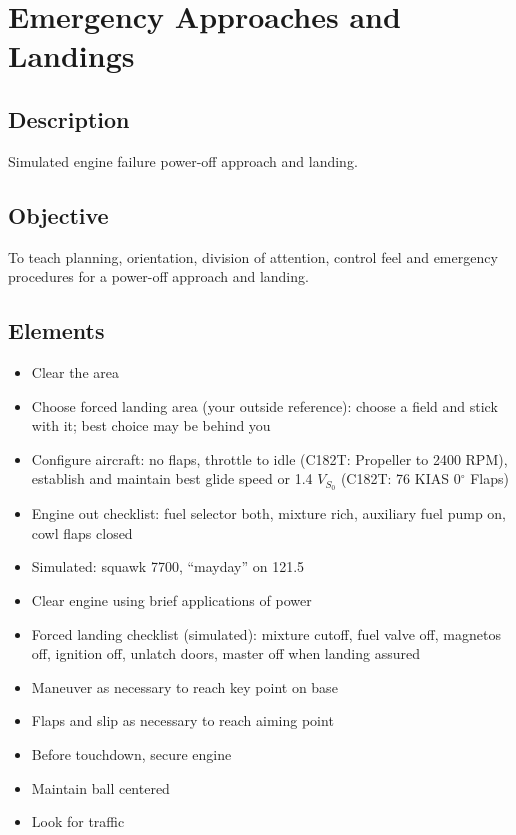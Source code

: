 \section{Emergency Approaches and Landings}

\subsection{Description}

Simulated engine failure power-off approach and landing.

\subsection{Objective}

To teach planning, orientation, division of attention, control feel and
emergency procedures for a power-off approach and landing.

\subsection{Elements}

\begin{itemize}
  \item Clear the area
  \item Choose forced landing area (your outside reference): choose a field and
    stick with it; best choice may be behind you
  \item Configure aircraft: no flaps, throttle to idle (C182T: Propeller to
    2400 RPM), establish and maintain best glide speed or 1.4 $V_{S_0}$ (C182T:
    76 KIAS 0$^\circ$ Flaps)
  \item Engine out checklist: fuel selector both, mixture
    rich, auxiliary fuel pump on, cowl flaps closed
  \item Simulated: squawk 7700, ``mayday'' on 121.5
  \item Clear engine using brief applications of power
  \item Forced landing checklist (simulated): mixture cutoff, fuel valve off,
    magnetos off, ignition off, unlatch doors, master off when landing assured
  \item Maneuver as necessary to reach key point on base
  \item Flaps and slip as necessary to reach aiming point
  \item Before touchdown, secure engine
  \item Maintain ball centered 
  \item Look for traffic
\end{itemize}

